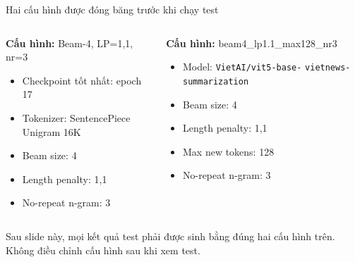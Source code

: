 \documentclass[aspectratio=169,10pt]{beamer}
\newcommand{\tightitems}{\setlength{\itemsep}{2.0pt}\setlength{\parskip}{0pt}}
\begin{document}
\begin{frame}{Hai cấu hình được đóng băng trước khi chạy test}
  \begin{columns}[T,onlytextwidth]
      \begin{tcolorbox}[
        title=Scratch Transformer,
        colback=SoftBlue,colframe=DeepBlue,
        colbacktitle=DeepBlue,coltitle=white,fonttitle=\bfseries]
        \small
        \textbf{Cấu hình:} Beam-4, LP=1,1, nr=3\par
        \vspace{1mm}
        \begin{itemize}\tightitems
          \item Checkpoint tốt nhất: epoch 17
          \item Tokenizer: SentencePiece Unigram 16K
          \item Beam size: 4
          \item Length penalty: 1,1
          \item No-repeat n-gram: 3
        \end{itemize}
      \end{tcolorbox}
      \begin{tcolorbox}[
        title=ViT5-Base,
        colback=white,colframe=VitPurple,
        colbacktitle=VitPurple,coltitle=white,fonttitle=\bfseries]
        \small
        \textbf{Cấu hình:} beam4\_lp1.1\_max128\_nr3\par
        \vspace{1mm}
        \begin{itemize}\tightitems
          \item Model: \texttt{VietAI/vit5-base-}
                \texttt{vietnews-summarization}
          \item Beam size: 4
          \item Length penalty: 1,1
          \item Max new tokens: 128
          \item No-repeat n-gram: 3
        \end{itemize}
      \end{tcolorbox}
  \end{columns}
  \vspace{0.15cm}
  \begin{keymessage}
    Sau slide này, mọi kết quả test phải được sinh bằng đúng hai cấu hình trên. Không điều chỉnh cấu hình sau khi xem test.
  \end{keymessage}
\end{frame}
\end{document}
